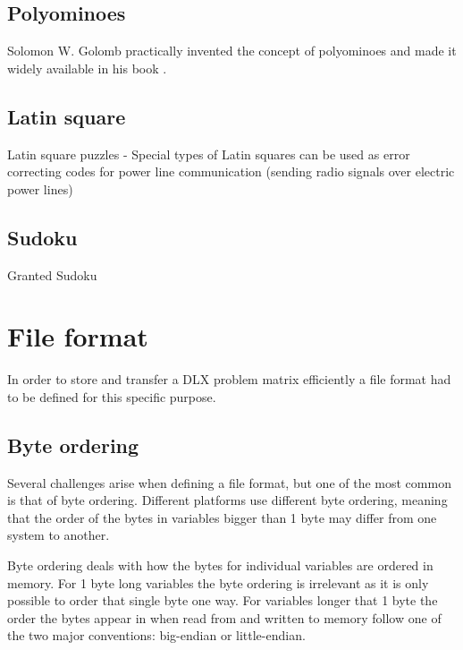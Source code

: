 \subsection{Polyominoes}
\label{poly_trans}

Solomon W. Golomb practically invented the concept of polyominoes and made it widely available in his book \cite{Polyominoes}.


\subsection{Latin square}
\label{latin_trans}

\cite{Colbourn04}

Latin square puzzles - Special types of Latin squares can be used as error correcting codes for power line communication (sending radio signals over electric power lines) \cite{Colbourn04}


\subsection{Sudoku}
\label{sudoku_trans}

Granted Sudoku 


\section{File format}

In order to store and transfer a DLX problem matrix efficiently a file format had to be defined for this specific purpose.


\subsection{Byte ordering}

Several challenges arise when defining a file format, but one of the most common is that of byte ordering.
Different platforms use different byte ordering, meaning that the order of the bytes in variables bigger than 1 byte may differ from one system to another.

Byte ordering deals with how the bytes for individual variables are ordered in memory.
For 1 byte long variables the byte ordering is irrelevant as it is only possible to order that single byte one way.
For variables longer that 1 byte the order the bytes appear in when read from and written to memory follow one of the two major conventions: big-endian or little-endian.

